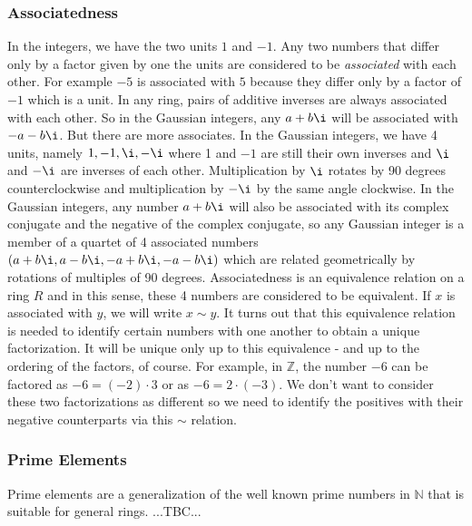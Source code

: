 \subsubsection{Associatedness}
In the integers, we have the two units $1$ and $-1$. Any two numbers that differ only by a factor given by one the units are considered to be \emph{associated} with each other. For example $-5$ is associated with $5$ because they differ only by a factor of $-1$ which is a unit. In any ring, pairs of additive inverses are always associated with each other. So in the Gaussian integers, any $a + b \i$ will be associated with $-a - b \i$. But there are more associates. In the Gaussian integers, we have 4 units, namely $1,-1,\i,-\i$ where 1 and $-1$ are still their own inverses and $\i$ and $-\i$ are inverses of each other. Multiplication by $\i$ rotates by 90 degrees counterclockwise and multiplication by $-\i$ by the same angle clockwise. In the Gaussian integers, any number $a + b \i$ will also be associated with its complex conjugate and the negative of the complex conjugate, so any Gaussian integer is a member of a quartet of 4 associated numbers $(a + b\i, a - b \i, -a + b \i, -a - b \i)$ which are related geometrically by rotations of multiples of 90 degrees. Associatedness is an equivalence relation on a ring $R$ and in this sense, these 4 numbers are considered to be equivalent. If $x$ is associated with $y$, we will write $x \sim y$. 
It turns out that this equivalence relation is needed to identify certain numbers with one another to obtain a unique factorization. It will be unique only up to this equivalence - and up to the ordering of the factors, of course. For example, in $\mathbb{Z}$, the number $-6$ can be factored as $-6 = (-2) \cdot 3$ or as $-6 = 2 \cdot (-3)$. We don't want to consider these two factorizations as different so we need to identify the positives with their negative counterparts via this $\sim$ relation.






\subsubsection{Prime Elements}
Prime elements are a generalization of the well known prime numbers in $\mathbb{N}$ that is suitable for general rings. ...TBC...


